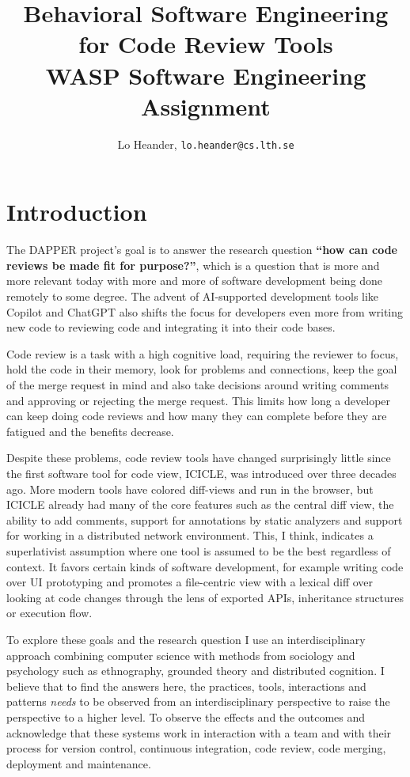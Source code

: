 \documentclass[a4paper,twocolumn]{article}
\title{Behavioral Software Engineering for Code Review Tools\\
\large WASP Software Engineering Assignment}
\author{\small Lo Heander, \texttt{\small lo.heander@cs.lth.se}}
\date{}
\begin{document}
\maketitle

\section*{Introduction}

The DAPPER project's goal is to answer the research question \textbf{``how can code reviews be made
fit for purpose?''}, which is a question that is more and more relevant today with more and more of
software development being done remotely to some degree. The advent of AI-supported development
tools like Copilot\cite{bird_taking_2023} and ChatGPT\cite{sobania_analysis_2023} also shifts the
focus for developers even more from writing new code to reviewing code and integrating it into their
code bases. 

Code review is a task with a high cognitive load\cite{pascarella_information_2018}, requiring the
reviewer to focus, hold the code in their memory, look for problems and connections, keep the goal
of the merge request in mind and also take decisions around writing comments and approving or
rejecting the merge request. This limits how long a developer can keep doing code reviews
and how many they can complete before they are fatigued and the benefits decrease. 

Despite these problems, code review tools have changed surprisingly little since the first software
tool for code view, ICICLE\cite{brothers_icicle_1990}, was introduced over three decades ago. More
modern tools have colored diff-views and run in the browser, but ICICLE already had many of the core
features such as the central diff view, the ability to add comments, support for annotations by
static analyzers and support for working in a distributed network environment. This, I 
think, indicates a superlativist assumption\cite{green1991comprehensibility} where 
one tool is assumed to be the best regardless of context. It favors certain kinds of software
development, for example writing code over UI prototyping and promotes a file-centric
view with a lexical diff over looking at code changes through the lens of exported APIs,
inheritance structures or execution flow. 

To explore these goals and the research question I use an interdisciplinary approach combining
computer science with methods from sociology and psychology such as
ethnography\cite{h_sharp_role_2016}, grounded theory\cite{adolph_using_2011} and distributed
cognition\cite{hutchins1995cognition}. I believe that to find the answers here, the practices,
tools, interactions and patterns \emph{needs} to be observed from an interdisciplinary perspective
to raise the perspective to a higher level. To observe the effects and the outcomes and acknowledge
that these systems work in interaction with a team and with their process for version control,
continuous integration, code review, code merging, deployment and maintenance. 
\end{document}
